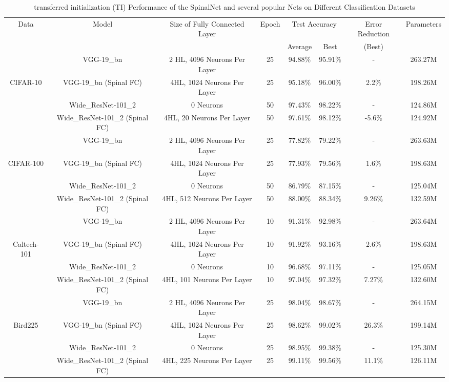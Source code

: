 \documentclass[journal]{IEEEtran}
\begin{document}
\begin{table*}
\centering
\caption{transferred initialization (TI) Performance of the SpinalNet and several popular Nets on Different Classification Datasets}
\label{Perf_TL}
\begin{tabular}{|c|c|c|c|c|c|c|c|}
\hline
 Data  & Model & Size of Fully Connected Layer & Epoch & \multicolumn{2}{|c|}{Test Accuracy} & Error Reduction & Parameters  \\ \cline{5-6}
 &&&&Average&Best&(Best)&
 \\\hline 
 
   & VGG-19\_bn & 2 HL, 4096 Neurons Per Layer & 25  &94.88\%&95.91\%  & - &263.27M\\  \cline{2-8}
  CIFAR-10    & VGG-19\_bn (Spinal FC) &  4HL, 1024 Neurons Per Layer & 25 &95.18\%& 96.00\%  & 2.2\% &198.26M\\  \cline{2-8}
 \cite{krizhevsky2009learning} & Wide\_ResNet-101\_2 & 0 Neurons & 50 &97.43\%& 98.22\%  & - &124.86M\\  \cline{2-8}
 & Wide\_ResNet-101\_2 (Spinal FC) & 4HL, 20 Neurons Per Layer &50 &97.61\%&98.12\% & -5.6\% &124.92M\\ \hline  \hline

   & VGG-19\_bn & 2 HL, 4096 Neurons Per Layer & 25 & 77.82\%& 79.22\%  & - &263.63M\\  \cline{2-8}
 CIFAR-100     & VGG-19\_bn (Spinal FC) &  4HL, 1024 Neurons Per Layer & 25 & 77.93\%& 79.56\%  & 1.6\% &198.63M\\  \cline{2-8}
  \cite{krizhevsky2009learning} & Wide\_ResNet-101\_2 & 0 Neurons & 50 &  86.79\%&87.15\%  & - &125.04M\\  \cline{2-8}
 & Wide\_ResNet-101\_2 (Spinal FC) &  4HL, 512 Neurons Per Layer &50 & 88.00\%&88.34\% & 9.26\% &132.59M\\ \hline \hline

   & VGG-19\_bn & 2 HL, 4096 Neurons Per Layer & 10 & 91.31\%& 92.98\%  & - &263.64M\\  \cline{2-8}
  Caltech-101     & VGG-19\_bn (Spinal FC) &  4HL, 1024 Neurons Per Layer & 10 & 91.92\%& 93.16\%  & 2.6\% &198.63M\\  \cline{2-8}
 \cite{li2004caltech} & Wide\_ResNet-101\_2 & 0 Neurons & 10 & 96.68\%& 97.11\%  & - &125.05M\\  \cline{2-8}
 & Wide\_ResNet-101\_2 (Spinal FC) & 4HL, 101 Neurons Per Layer &10 & 97.04\%&97.32\% & 7.27\% &132.60M\\ \hline \hline


  & VGG-19\_bn & 2 HL, 4096 Neurons Per Layer & 25 & 98.04\%& 98.67\%  & - &264.15M\\  \cline{2-8}
 Bird225 & VGG-19\_bn (Spinal FC) & 4HL, 1024 Neurons Per Layer &25 & 98.62\% &99.02\% & 26.3\% &199.14M\\ \cline{2-8}
 \cite{bird225} & Wide\_ResNet-101\_2 & 0 Neurons & 25 & 98.95\%& 99.38\%  & - &125.30M\\  \cline{2-8} 
 & Wide\_ResNet-101\_2 (Spinal FC) & 4HL, 225 Neurons Per Layer &25 & 99.11\%&99.56\% & 11.1\% &126.11M\\ \hline \hline



\end{tabular}
\end{table*}
\end{document}
